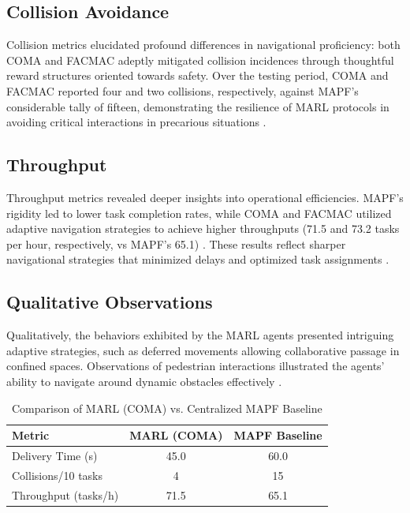 \documentclass[conference]{IEEEtran}
\begin{document}
\subsection{Collision Avoidance}
Collision metrics elucidated profound differences in navigational proficiency: both COMA and FACMAC adeptly mitigated collision incidences through thoughtful reward structures oriented towards safety. Over the testing period, COMA and FACMAC reported four and two collisions, respectively, against MAPF’s considerable tally of fifteen, demonstrating the resilience of MARL protocols in avoiding critical interactions in precarious situations \citep{salinas2023}.

\subsection{Throughput}
Throughput metrics revealed deeper insights into operational efficiencies. MAPF’s rigidity led to lower task completion rates, while COMA and FACMAC utilized adaptive navigation strategies to achieve higher throughputs (71.5 and 73.2 tasks per hour, respectively, vs MAPF’s 65.1) \citep{salinas2023}. These results reflect sharper navigational strategies that minimized delays and optimized task assignments \citep{gerkey2023}.

\subsection{Qualitative Observations}
Qualitatively, the behaviors exhibited by the MARL agents presented intriguing adaptive strategies, such as deferred movements allowing collaborative passage in confined spaces. Observations of pedestrian interactions illustrated the agents’ ability to navigate around dynamic obstacles effectively \citep{rostumi2019}.



\begin{table}[h]
\caption{Comparison of MARL (COMA) vs. Centralized MAPF Baseline}
\label{tab:comparison}
\begin{tabular}{|l|c|c|}
\hline
\textbf{Metric} & \textbf{MARL (COMA)} & \textbf{MAPF Baseline} \\
\hline
Delivery Time (s) & 45.0 & 60.0 \\
Collisions/10 tasks & 4 & 15 \\
Throughput (tasks/h) & 71.5 & 65.1 \\
\hline
\end{tabular}
\end{table}
\end{document}
